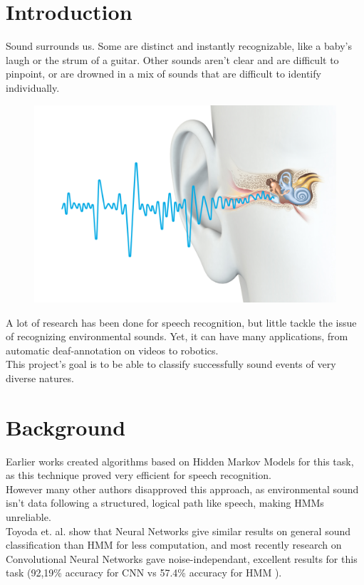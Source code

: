 \documentclass[final]{beamer}
\title
[Final Presentation for ML Course, June 13th 2017, Beijing]
{ %
Freesound General-Purpose Audio Tagging Challenge
}
\author{ %
Usama Zafar, Sarah Gross
}
\institute
{
	Tsinghua University, China
}
\date{\today}
\begin{document}
\begin{frame}[t]
\begin{multicols}{3}

\section{Introduction}

	Sound surrounds us. Some are distinct and instantly recognizable, like a baby's laugh or the strum of a guitar. Other sounds aren't clear and are difficult to pinpoint, or are drowned in a mix of sounds that are difficult to identify individually.\\

	\begin{figure}
	\centering
	\includegraphics[width=0.5\columnwidth]{ear_sound.jpg}
	\end{figure}

	A lot of research has been done for speech recognition, but little tackle the issue of recognizing environmental sounds. Yet, it can have many applications, from automatic deaf-annotation on videos to robotics.\\
	This project's goal is to be able to classify successfully sound events of very diverse natures.

\section{Background}

	Earlier works \cite{ref1} \cite{ref2} created algorithms based on Hidden Markov Models for this task, as this technique proved very efficient for speech recognition.\\
	However many other authors \cite{ref3} \cite{ref4} disapproved this approach, as environmental sound isn't data following a structured, logical path like speech, making HMMs unreliable.\\
	Toyoda et. al. \cite{ref5} show that Neural Networks give similar results on general sound classification than HMM for less computation, and most recently research on Convolutional Neural Networks \cite{ref4} \cite{ref6} gave noise-independant, excellent results for this task (92,19\% accuracy for CNN vs 57.4\% accuracy for HMM \cite{ref4}).


\end{multicols}
\end{frame}
\end{document}
